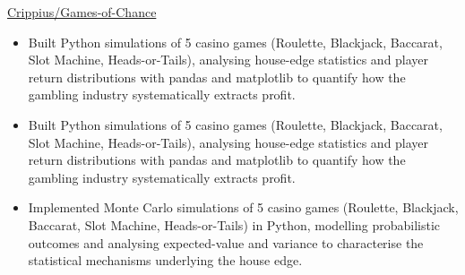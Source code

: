  {}
{
}
{\href{https://github.com/Crippius/Games-of-Chance}
{Crippius/Games-of-Chance}}
\begin{itemize}

    \ifde
        \item Built Python simulations of 5 casino games (Roulette, Blackjack, Baccarat, Slot Machine, Heads-or-Tails), analysing house-edge statistics and player return distributions with pandas and matplotlib to quantify how the gambling industry systematically extracts profit.
    \else
        \ifhpc
            \item Built Python simulations of 5 casino games (Roulette, Blackjack, Baccarat, Slot Machine, Heads-or-Tails), analysing house-edge statistics and player return distributions with pandas and matplotlib to quantify how the gambling industry systematically extracts profit.
        \else
            \item Implemented Monte Carlo simulations of 5 casino games (Roulette, Blackjack, Baccarat, Slot Machine, Heads-or-Tails) in Python, modelling probabilistic outcomes and analysing expected-value and variance to characterise the statistical mechanisms underlying the house edge.
        \fi
    \fi

\end{itemize}

\medskip
